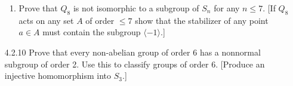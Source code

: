 \documentclass[9pt]{article}
\newcommand{\cyc}[1]{\langle #1 \rangle}
\begin{document}
\begin{enumerate}
\begin{enumerate}
                     \item Prove that $Q_8$ is not isomorphic to a subgroup of
                           $S_n$ for any $n \le 7$. [If $Q_8$ acts on any set
                           $A$ of order $\le 7$ show that the stabilizer of any
                           point $a \in A$ must contain the subgroup
                           $\cyc{-1}$.]
                  \end{enumerate}
   \item[4.2.10]  Prove that every non-abelian group of order 6 has a nonnormal
                  subgroup of order 2. Use this to classify groups of order 6.
                  [Produce an injective homomorphism into $S_3$.]
\end{enumerate}
\end{document}
